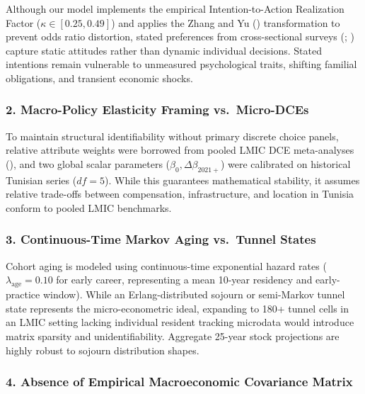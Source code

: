 \documentclass[
  11pt,
  a4paper]{article}
\begin{document}
Although our model implements the empirical Intention-to-Action
Realization Factor (\(\kappa \in [0.25, 0.49]\)) and applies the Zhang
and Yu () transformation to prevent odds
ratio distortion, stated preferences from cross-sectional surveys
(;
) capture static attitudes
rather than dynamic individual decisions. Stated intentions remain
vulnerable to unmeasured psychological traits, shifting familial
obligations, and transient economic shocks.

\subsubsection{2. Macro-Policy Elasticity Framing
vs.~Micro-DCEs}\label{macro-policy-elasticity-framing-vs.-micro-dces}

To maintain structural identifiability without primary discrete choice
panels, relative attribute weights were borrowed from pooled LMIC DCE
meta-analyses (),
and two global scalar parameters (\(\beta_0, \Delta \beta_{2021+}\))
were calibrated on historical Tunisian series (\(df = 5\)). While this
guarantees mathematical stability, it assumes relative trade-offs
between compensation, infrastructure, and location in Tunisia conform to
pooled LMIC benchmarks.

\subsubsection{3. Continuous-Time Markov Aging vs.~Tunnel
States}\label{continuous-time-markov-aging-vs.-tunnel-states}

Cohort aging is modeled using continuous-time exponential hazard rates
(\(\lambda_{\text{age}} = 0.10\) for early career, representing a mean
10-year residency and early-practice window). While an
Erlang-distributed sojourn or semi-Markov tunnel state represents the
micro-econometric ideal, expanding to 180+ tunnel cells in an LMIC
setting lacking individual resident tracking microdata would introduce
matrix sparsity and unidentifiability. Aggregate 25-year stock
projections are highly robust to sojourn distribution shapes.

\subsubsection{4. Absence of Empirical Macroeconomic Covariance
Matrix}\label{absence-of-empirical-macroeconomic-covariance-matrix}
\end{document}
